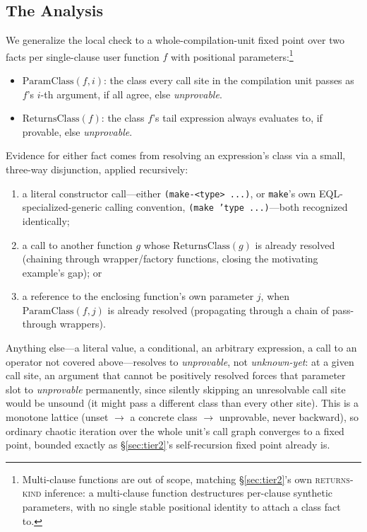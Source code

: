 \documentclass[sigplan,review,anonymous]{acmart}
\begin{document}
\subsection{The Analysis}
\label{sec:interp-analysis}

We generalize the local check to a whole-compilation-unit fixed point over two facts per single-clause user function $f$ with positional parameters:\footnote{Multi-clause functions are out of scope, matching \S\ref{sec:tier2}'s own \textsc{returns-kind} inference: a multi-clause function destructures per-clause synthetic parameters, with no single stable positional identity to attach a class fact to.}

\begin{itemize}
    \item $\mathrm{ParamClass}(f, i)$: the class every call site in the compilation unit passes as $f$'s $i$-th argument, if all agree, else \emph{unprovable}.
    \item $\mathrm{ReturnsClass}(f)$: the class $f$'s tail expression always evaluates to, if provable, else \emph{unprovable}.
\end{itemize}

Evidence for either fact comes from resolving an expression's class via a small, three-way disjunction, applied recursively:
\begin{enumerate}
    \item a literal constructor call---either \texttt{(make-<type> ...)}, or \texttt{make}'s own EQL-specialized-generic calling convention, \texttt{(make 'type ...)}---both recognized identically;
    \item a call to another function $g$ whose $\mathrm{ReturnsClass}(g)$ is already resolved (chaining through wrapper/factory functions, closing the motivating example's gap); or
    \item a reference to the enclosing function's own parameter $j$, when $\mathrm{ParamClass}(f, j)$ is already resolved (propagating through a chain of pass-through wrappers).
\end{enumerate}
Anything else---a literal value, a conditional, an arbitrary expression, a call to an operator not covered above---resolves to \emph{unprovable}, not \emph{unknown-yet}: at a given call site, an argument that cannot be positively resolved forces that parameter slot to \emph{unprovable} permanently, since silently skipping an unresolvable call site would be unsound (it might pass a different class than every other site). This is a monotone lattice (unset $\to$ a concrete class $\to$ unprovable, never backward), so ordinary chaotic iteration over the whole unit's call graph converges to a fixed point, bounded exactly as \S\ref{sec:tier2}'s self-recursion fixed point already is.
\end{document}
